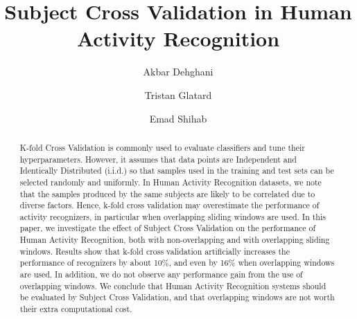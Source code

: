 \documentclass[sigconf]{acmart}
\begin{document}
%
\title{Subject Cross Validation in Human Activity Recognition}

%


\author{Akbar Dehghani}
 
\author{Tristan Glatard}

\author{Emad Shihab}


%
\begin{abstract}
K-fold Cross Validation is commonly used to evaluate classifiers
and tune their hyperparameters. However, it assumes that data points are Independent and Identically 
Distributed (i.i.d.) so that samples used in the training and test 
sets can be selected randomly and uniformly. In Human Activity Recognition datasets, 
we note that the samples produced by the same subjects are likely to be correlated due 
to diverse factors. Hence, 
k-fold cross validation may overestimate the performance of 
activity recognizers, in particular when overlapping sliding windows are used. 
In this paper, we investigate the effect of Subject 
Cross Validation on the performance of Human Activity Recognition, 
both with non-overlapping and with overlapping sliding windows. 
Results show that k-fold cross validation artificially 
increases the performance of recognizers by about 10\%, and even by 16\% when overlapping windows are used. In addition, we do not observe any performance gain from the use of overlapping windows. We conclude that Human Activity Recognition systems should be evaluated by Subject Cross Validation, and that overlapping windows are not worth their extra computational cost. 
\end{abstract}

%
%
\end{document}

